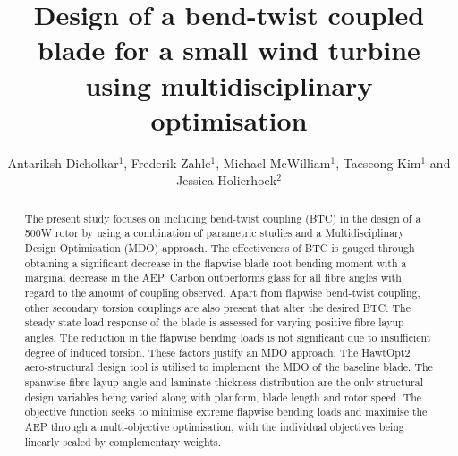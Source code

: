 \documentclass[a4paper]{jpconf}
\begin{document}
\title{Design of a bend-twist coupled blade for a small wind turbine using multidisciplinary optimisation}

\author{Antariksh Dicholkar$^1$, Frederik Zahle$^1$, Michael McWilliam$^1$, Taeseong Kim$^1$ and Jessica Holierhoek$^2$}

\address{$^1$ DTU Wind Energy, DTU Ris{\o} campus, Frederiksborgvej 399, DK-4000 Roskilde}
\address{$^2$ Faculty of Aerospace Engineering, TU Delft, Kluyverweg 1, 2629 HS Delft, The Netherlands}

\begin{abstract}
The present study focuses on including bend-twist coupling (BTC) in the design of a 500W rotor by using a combination of parametric studies and a Multidisciplinary Design Optimisation (MDO) approach. The effectiveness of BTC is gauged through obtaining a significant decrease in the flapwise blade root bending moment with a marginal decrease in the AEP. Carbon outperforms glass for all fibre angles with regard to the amount of coupling observed. Apart from flapwise bend-twist coupling, other secondary torsion couplings are also present that alter the desired BTC. The steady state load response of the blade is assessed for varying positive fibre layup angles. The reduction in the flapwise bending loads is not significant due to insufficient degree of induced torsion. These factors justify an MDO approach. The HawtOpt2 aero-structural design tool is utilised to implement the MDO of the baseline blade. The spanwise fibre layup angle and laminate thickness distribution are the only structural design variables being varied along with planform, blade length and rotor speed. The objective function seeks to minimise extreme flapwise bending loads and maximise the AEP through a multi-objective optimisation, with the individual objectives being linearly scaled by complementary weights.
\end{abstract}
\end{document}
